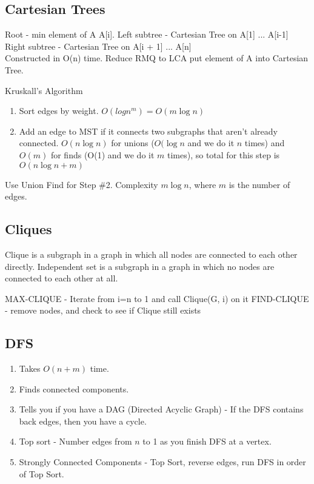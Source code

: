 \documentclass[8pt,twocolumn]{article}
\begin{document}
\subsection{Cartesian Trees}
Root - min element of A A[i].  Left subtree - Cartesian Tree on A[1] ... A[i-1]
Right subtree - Cartesian Tree on A[i + 1] ... A[n]\\
Constructed in O(n) time.
Reduce RMQ to LCA put element of A into Cartesian Tree.



Kruskall's Algorithm
\begin{enumerate}
    \item Sort edges by weight. $O(logn^m) = O(m\log{n})$
    \item Add an edge to MST if it connects two subgraphs that aren't already connected. $O(n\log{n})$ for
        unions ($O(\log{n}$ and we do it $n$ times) and $O(m)$ for finds (O(1) and we do it $m$ times), so total for this step is $O(n\log{n}+m)$
\end{enumerate}

Use Union Find for Step \#2. Complexity $m \log n$, where $m$ is the number of edges.

\subsection{Cliques}

Clique is a subgraph in a graph in which all nodes are connected to each other directly.
Independent set is a subgraph in a graph in which no nodes are connected to each other at all.

MAX-CLIQUE - Iterate from i=n to 1 and call Clique(G, i) on it
FIND-CLIQUE - remove nodes, and check to see if Clique still exists

\subsection{DFS}
\begin{enumerate}
    \item Takes $O(n+m)$ time.
    \item Finds connected components.
    \item Tells you if you have a DAG (Directed Acyclic Graph) - If the DFS contains back edges, then you have a cycle.
    \item Top sort - Number edges from $n$ to 1 as you finish DFS at a vertex.
    \item Strongly Connected Components - Top Sort, reverse edges, run DFS in order of Top Sort.
\end{enumerate}
\end{document}
